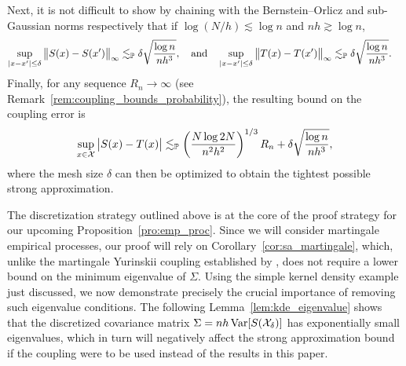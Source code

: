 Next, it is not difficult to show by chaining with the Bernstein--Orlicz and
sub-Gaussian norms respectively \citep[Section~2.2]{van1996weak} that if
$\log(N/h) \lesssim \log n$ and $n h \gtrsim \log n$,
%
\begin{align*}
  \sup_{|x-x'| \leq \delta}
  \big\|S(x) - S(x') \big\|_\infty
  &\lesssim_\P
  \delta
  \sqrt{\frac{\log n}{n h^3}}, \quad\text{and}\quad
  \sup_{|x-x'| \leq \delta}
  \big\|T(x) - T(x')\big\|_\infty
  \lesssim_\P
  \delta
  \sqrt{\frac{\log n}{n h^3}}.
\end{align*}
%
Finally, for any sequence $R_n\to\infty$
(see Remark~\ref{rem:coupling_bounds_probability}),
the resulting bound on the coupling error is
\[\sup_{x \in \cX}
  \big| S(x) - T(x) \big| \lesssim_\P
  \left( \frac{N \log 2N}{n^2 h^2} \right)^{1/3} R_n
  + \delta \sqrt{\frac{\log n}{n h^3}},\]
where the mesh size $\delta$ can then be optimized to obtain the tightest
possible strong
approximation.

The discretization strategy outlined above is at the core of the proof strategy
for our upcoming Proposition~\ref{pro:emp_proc}. Since we will consider
martingale empirical processes, our proof will rely on
Corollary~\ref{cor:sa_martingale}, which, unlike the martingale Yurinskii
coupling established by \citet{li2020uniform}, does not require a lower bound
on the minimum eigenvalue of $\Sigma$. Using the simple kernel density example
just discussed, we now demonstrate precisely the crucial importance of removing
such eigenvalue conditions. The following Lemma~\ref{lem:kde_eigenvalue} shows
that the discretized covariance matrix $\Sigma = n h\Var[S(\cX_\delta)]$ has
exponentially small eigenvalues, which in turn will negatively affect the
strong approximation bound if the \citet{li2020uniform} coupling were to be
used instead of the results in this paper.

